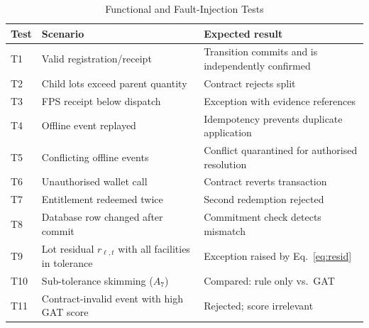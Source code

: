 \documentclass[conference,a4paper]{IEEEtran}
\begin{document}
\begin{table}[!t]
\caption{Functional and Fault-Injection Tests}
\label{tab:tests}
\centering\footnotesize
\begin{tabularx}{\columnwidth}{@{}l p{1.15in} X@{}}
\toprule
Test & Scenario & Expected result\\
\midrule
T1 & Valid registration/receipt & Transition commits and is independently confirmed\\
T2 & Child lots exceed parent quantity & Contract rejects split\\
T3 & FPS receipt below dispatch & Exception with evidence references\\
T4 & Offline event replayed & Idempotency prevents duplicate application\\
T5 & Conflicting offline events & Conflict quarantined for authorised resolution\\
T6 & Unauthorised wallet call & Contract reverts transaction\\
T7 & Entitlement redeemed twice & Second redemption rejected\\
T8 & Database row changed after commit & Commitment check detects mismatch\\
T9 & Lot residual $r_{\ell,t}$ with all facilities in tolerance & Exception raised by Eq.~\eqref{eq:resid}\\
T10 & Sub-tolerance skimming ($A_7$) & Compared: rule only vs.\ GAT\\
T11 & Contract-invalid event with high GAT score & Rejected; score irrelevant\\
\bottomrule
\end{tabularx}
\end{table}
\end{document}
